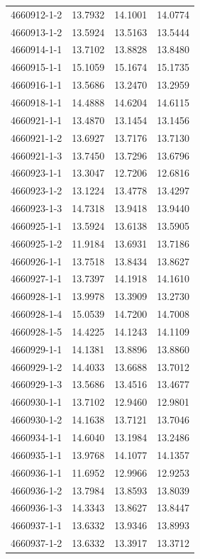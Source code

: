 \begin{longtable}{lrrr}
4660912-1-2 & 13.7932 & 14.1001 & 14.0774 \\
4660913-1-2 & 13.5924 & 13.5163 & 13.5444 \\
4660914-1-1 & 13.7102 & 13.8828 & 13.8480 \\
4660915-1-1 & 15.1059 & 15.1674 & 15.1735 \\
4660916-1-1 & 13.5686 & 13.2470 & 13.2959 \\
4660918-1-1 & 14.4888 & 14.6204 & 14.6115 \\
4660921-1-1 & 13.4870 & 13.1454 & 13.1456 \\
4660921-1-2 & 13.6927 & 13.7176 & 13.7130 \\
4660921-1-3 & 13.7450 & 13.7296 & 13.6796 \\
4660923-1-1 & 13.3047 & 12.7206 & 12.6816 \\
4660923-1-2 & 13.1224 & 13.4778 & 13.4297 \\
4660923-1-3 & 14.7318 & 13.9418 & 13.9440 \\
4660925-1-1 & 13.5924 & 13.6138 & 13.5905 \\
4660925-1-2 & 11.9184 & 13.6931 & 13.7186 \\
4660926-1-1 & 13.7518 & 13.8434 & 13.8627 \\
4660927-1-1 & 13.7397 & 14.1918 & 14.1610 \\
4660928-1-1 & 13.9978 & 13.3909 & 13.2730 \\
4660928-1-4 & 15.0539 & 14.7200 & 14.7008 \\
4660928-1-5 & 14.4225 & 14.1243 & 14.1109 \\
4660929-1-1 & 14.1381 & 13.8896 & 13.8860 \\
4660929-1-2 & 14.4033 & 13.6688 & 13.7012 \\
4660929-1-3 & 13.5686 & 13.4516 & 13.4677 \\
4660930-1-1 & 13.7102 & 12.9460 & 12.9801 \\
4660930-1-2 & 14.1638 & 13.7121 & 13.7046 \\
4660934-1-1 & 14.6040 & 13.1984 & 13.2486 \\
4660935-1-1 & 13.9768 & 14.1077 & 14.1357 \\
4660936-1-1 & 11.6952 & 12.9966 & 12.9253 \\
4660936-1-2 & 13.7984 & 13.8593 & 13.8039 \\
4660936-1-3 & 14.3343 & 13.8627 & 13.8447 \\
4660937-1-1 & 13.6332 & 13.9346 & 13.8993 \\
4660937-1-2 & 13.6332 & 13.3917 & 13.3712 \\

\end{longtable}
